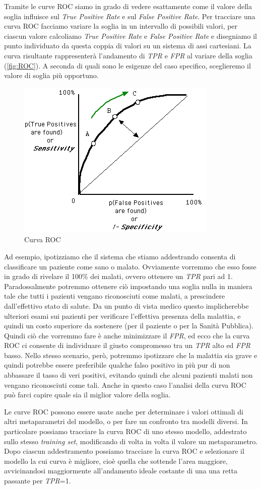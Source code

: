 Tramite le curve ROC siamo in grado di vedere esattamente come il valore della soglia influisce sul \emph{True Positive Rate} e sul \emph{False Positive Rate}. Per tracciare una curva ROC facciamo variare la soglia in un intervallo di possibili valori, per ciascun valore calcoliamo \emph{True Positive Rate} e \emph{False Positive Rate} e disegniamo il punto individuato da questa coppia di valori su un sistema di assi cartesiani. La curva risultante rappresenterà l'andamento di \emph{TPR} e \emph{FPR} al variare della soglia (\autoref{fig:ROC}). A seconda di quali sono le esigenze del caso specifico, sceglieremo il valore di soglia più opportuno.

\begin{figure}[tbp]
\centering
  \includegraphics[width=0.5 \textwidth]{images/ROC}
  \caption{Curva ROC}
  \label{fig:ROC}
\end{figure}

Ad esempio, ipotizziamo che il sistema che stiamo addestrando consenta di classificare un paziente come sano o malato. Ovviamente vorremmo che esso fosse in grado di rivelare il 100\% dei malati, ovvero ottenere un \emph{TPR} pari ad 1. Paradossalmente potremmo ottenere ciò impostando una soglia nulla in maniera tale che tutti i pazienti vengano riconosciuti come malati, a prescindere dall'effettivo stato di salute. Da un punto di vista medico questo implicherebbe ulteriori esami sui pazienti per verificare l'effettiva presenza della malattia, e quindi un costo superiore da sostenere (per il paziente o per la Sanità Pubblica). Quindi ciò che vorremmo fare è anche minimizzare il \emph{FPR}, ed ecco che la curva ROC ci consente di individuare il giusto compromesso tra un \emph{TPR} alto ed \emph{FPR} basso. 
Nello stesso scenario, però, potremmo ipotizzare che la malattia sia grave e quindi potrebbe essere preferibile qualche falso positivo in più pur di non abbassare il tasso di veri positivi, evitando quindi che alcuni pazienti malati non vengano riconosciuti come tali. Anche in questo caso l'analisi della curva ROC può farci capire quale sia il miglior valore della soglia.

Le curve ROC possono essere usate anche per determinare i valori ottimali di altri metaparametri del modello, o per fare un confronto tra modelli diversi. In particolare possiamo tracciare la curva ROC di uno stesso modello, addestrato sullo stesso \emph{training set}, modificando di volta in volta il valore un metaparametro. Dopo ciascun addestramento possiamo tracciare la curva ROC e selezionare il modello la cui curva è migliore, cioè quella che sottende l'area maggiore, avvicinandosi maggiormente all'andamento ideale costante di una una retta passante per \emph{TPR}=1. 